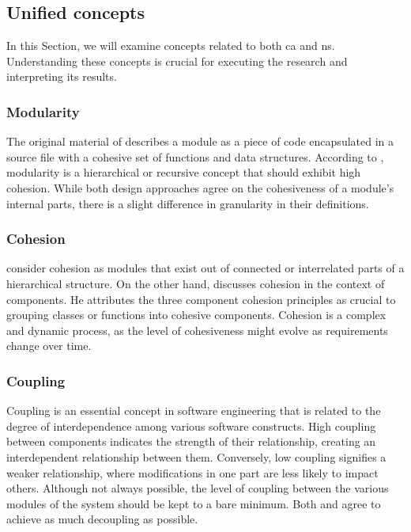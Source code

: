 \subsection{Unified concepts}
In this Section, we will examine concepts related to both \gls{ca} and \gls{ns}.
Understanding these concepts is crucial for executing the research and interpreting its
results.

\subsubsection{Modularity}
The original material of \textcite[82]{r_c_martin_clean_2018} describes a module as a 
piece of code encapsulated in a source file with a cohesive set of functions and data
structures. According to \textcite[22]{mannaert_normalized_2016}, modularity is a 
hierarchical or recursive concept that should exhibit high cohesion. While both design
approaches agree on the cohesiveness of a module's internal parts, there is a slight 
difference in granularity in their definitions.

\subsubsection{Cohesion}
\textcite[22]{mannaert_normalized_2016} consider cohesion as modules that exist out of
connected or interrelated parts of a hierarchical structure. On the other hand,
\textcite[118]{r_c_martin_clean_2018} discusses cohesion in the context of
components. He attributes the three component cohesion principles as crucial to grouping
classes or functions into cohesive components. Cohesion is a complex and dynamic process,
as the level of cohesiveness might evolve as requirements change over time. 

\subsubsection{Coupling}
Coupling is an essential concept in software engineering that is related to the degree of
interdependence among various software constructs. High coupling between components
indicates the strength of their relationship, creating an interdependent relationship
between them. Conversely, low coupling signifies a weaker relationship, where
modifications in one part are less likely to impact others. Although not always possible,
the level of coupling between the various modules of the system should be kept to a bare
minimum. Both \textcite[23]{mannaert_normalized_2016} and
\textcite[130]{r_c_martin_clean_2018} agree to achieve as much decoupling as possible.